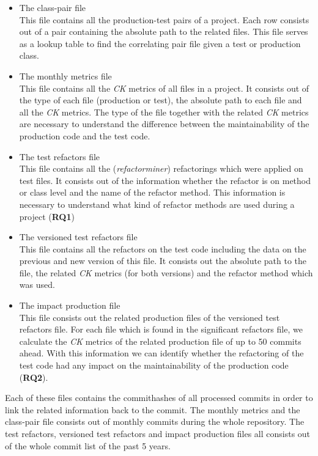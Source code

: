 \begin{itemize}
\item The class-pair file\\
This file contains all the production-test pairs of a project. Each row consists out of a pair containing the absolute path to the related files. This file serves as a lookup table to find the correlating pair file given a test or production class.
\item The monthly metrics file\\
This file contains all the \textit{CK} metrics of all files in a project. It consists out of the type of each file (production or test), the absolute path to each file and all the \textit{CK} metrics. The type of the file together with the related \textit{CK} metrics are necessary to understand the difference between the maintainability of the production code and the test code. 
\item The test refactors file\\
This file contains all the (\textit{refactorminer}) refactorings which were applied on test files. It consists out of the information whether the refactor is on method or class level and the name of the refactor method. This information is necessary to understand what kind of refactor methods are used during a project (\textbf{RQ1})
\item The versioned test refactors file\\
This file contains all the refactors on the test code including the data on the previous and new version of this file. It consists out the absolute path to the file, the related \textit{CK} metrics (for both versions) and the refactor method which was used.
\item The impact production file\\
This file consists out the related production files of the versioned test refactors file. For each file which is found in the significant refactors file, we calculate the \textit{CK} metrics of the related production file of up to 50 commits ahead. With this information we can identify whether the refactoring of the test code had any impact on the maintainability of the production code (\textbf{RQ2}).
\end{itemize}
Each of these files contains the commithashes of all processed commits in order to link the related information back to the commit. The monthly metrics and the class-pair file consists out of monthly commits during the whole repository. The test refactors, versioned test refactors and impact production files all consists out of the whole commit list of the past 5 years.
